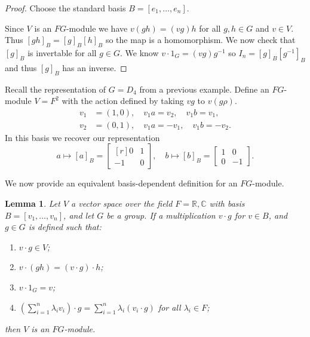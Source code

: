 \documentclass[11pt, notitlepage]{article}
\numberwithin{equation}{section}
\theoremstyle{plain}
\newtheorem{lemma}[theorem]{Lemma}
\theoremstyle{definition}
\newenvironment{example}
	{\pushQED{\qed}\renewcommand{\qedsymbol}{$\blacktriangleleft$}\examplex}
	{\popQED\endexamplex}
\newcommand{\R}{\mathbb{R}}
\newcommand{\C}{\mathbb{C}}
\begin{document}
\begin{proof}
Choose the standard basis $B = [e_1, \ldots, e_n]$.

Since $V$ is an $FG$-module we have $v(gh) = (vg)h$ for all $g, h \in G$ and $v \in V$. Thus $[gh]_B = [g]_B [h]_B$ so the map is a homomorphism. We now check that $[g]_B$ is invertable for all $g \in G$. We know $v \cdot 1_G = (v g) g^{-1}$ so $I_n = [g]_B [g^{-1}]_B$ and thus $[g]_B$ has an inverse.
\end{proof}

\begin{example}
	Recall the representation of $G=D_4$ from a previous example. Define an $FG$-module $V=F^2$ with the action defined by taking $vg$ to $v(g\rho)$.
\begin{align*}
	v_1 &= (1,0), \quad v_1 a = v_2, \quad v_1 b = v_1,\\
	v_2 &= (0,1), \quad v_1 a = -v_1, \quad v_1 b = -v_2.
\end{align*}	
In this basis we recover our representation
\[
	a \mapsto [a]_B = \begin{bmatrix*}[r] 0 & 1\\ -1 & 0 \end{bmatrix*}, \quad
	b \mapsto [b]_B = \begin{bmatrix} 1 & 0\\ 0 & -1 \end{bmatrix}.
\]
\end{example}


We now provide an equivalent basis-dependent definition for an $FG$-module.
\begin{lemma}
	Let $V$ a vector space over the field $F = \R,\C$ with basis $B = [v_1, \ldots, v_n]$, and let $G$ be a group. If a multiplication $v \cdot g$ for $v \in B$, and $g \in G$ is defined such that:
\begin{enumerate}[label=(\roman*)]
    \item $v \cdot g \in V$;
    \item $v \cdot (gh) = (v \cdot g) \cdot h$;
    \item $v \cdot 1_G = v$;
    \item $\left( \sum_{i=1}^n \lambda_i v_i \right) \cdot g = \sum_{i=1}^n \lambda_i (v_i \cdot g)$ for all $\lambda_i \in F$;
\end{enumerate}
then $V$ is an $FG$-module.
\end{lemma}

\end{document}
